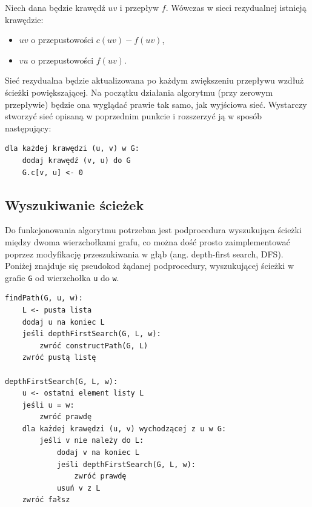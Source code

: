 \documentclass[12pt,a4paper]{article}
\theoremstyle{definition}
\begin{document}
\noindent
Niech dana będzie krawędź $uv$ i przepływ $f$. Wówczas w sieci rezydualnej istnieją krawędzie:
\begin{itemize}
	\item $uv$ o przepustowości $c(uv) - f(uv)$,
	\item $vu$ o przepustowości $f(uv)$.\\
\end{itemize}

\noindent
Sieć rezydualna będzie aktualizowana po każdym zwiększeniu przepływu wzdłuż ścieżki powiększającej. Na początku działania algorytmu (przy zerowym przepływie) będzie ona wyglądać prawie tak samo, jak wyjściowa sieć. Wystarczy stworzyć sieć opisaną w poprzednim punkcie i rozszerzyć ją w sposób następujący:\\

\begin{tcolorbox}[title=Rozszerzenie konstrukcji sieci podstawowej]
\begin{verbatim}
dla każdej krawędzi (u, v) w G:
    dodaj krawędź (v, u) do G
    G.c[v, u] <- 0
\end{verbatim}
\end{tcolorbox}

\subsection{Wyszukiwanie ścieżek}
Do funkcjonowania algorytmu potrzebna jest podprocedura wyszukująca ścieżki między dwoma wierzchołkami grafu, co można dość prosto zaimplementować poprzez modyfikację przeszukiwania w głąb (ang. depth-first search, DFS). Poniżej znajduje się pseudokod żądanej podprocedury, wyszukującej ścieżki w grafie \texttt{G} od wierzchołka \texttt{u} do \texttt{w}.\\

\begin{tcolorbox}[title=Wyszukiwanie ścieżek w grafie]
\begin{verbatim}
findPath(G, u, w):
    L <- pusta lista
    dodaj u na koniec L
    jeśli depthFirstSearch(G, L, w):
        zwróć constructPath(G, L)
    zwróć pustą listę

depthFirstSearch(G, L, w):
    u <- ostatni element listy L
    jeśli u = w:
        zwróć prawdę
    dla każdej krawędzi (u, v) wychodzącej z u w G:
        jeśli v nie należy do L:
            dodaj v na koniec L
            jeśli depthFirstSearch(G, L, w):
                zwróć prawdę
            usuń v z L
    zwróć fałsz
\end{verbatim}
\end{tcolorbox}
\end{document}
